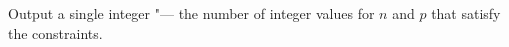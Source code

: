 Output a single integer "--- the number of integer values for $n$ and $p$ that satisfy the constraints.
